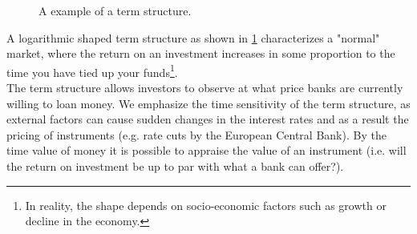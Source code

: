 \begin{figure}[h!]
\begin{center}
\caption{A example of a term structure.}
\label{fig:anc}
\end{center}
\end{figure}

A logarithmic shaped term structure as shown in \ref{fig:anc} characterizes a
"normal" market, where the return on an investment increases in some proportion
to the time you have tied up your funds\footnote{In reality, the shape depends on 
socio-economic factors such as growth or decline in the economy.}.\\

The term structure allows investors to observe at what price banks are
currently willing to loan money. We emphasize the time sensitivity of the term
structure, as external factors can cause sudden changes in the interest
rates and as a result the pricing of instruments (e.g. rate cuts by the
European Central Bank). By the time value of money it is possible to
appraise the value of an instrument (i.e. will the return on investment
be up to par with what a bank can offer?).\\

